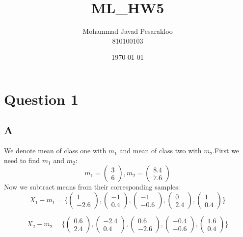 \documentclass{article}
\title{ML\_HW5}
\author{Mohammad Javad Pesarakloo\\810100103}
\date{\today}
\begin{document}
\maketitle

\section*{Question 1}
\subsection*{A}
We denote mean of class one with $m_1$ and mean of class two with $m_2$.First we need to find $m_1$ and $m_2$:
\begin{equation*}
    m_1 = \begin{pmatrix}
        3\\6
    \end{pmatrix}, m_2 = \begin{pmatrix}
        8.4\\7.6
    \end{pmatrix}
\end{equation*}
Now we subtract means from their corresponding samples:
\begin{equation*}
    X_1 - m_1 = \lbrace \begin{pmatrix}
        1\\-2.6
    \end{pmatrix},\begin{pmatrix}
        -1\\0.4
    \end{pmatrix},\begin{pmatrix}
        -1\\-0.6
    \end{pmatrix},\begin{pmatrix}
        0\\2.4
    \end{pmatrix},\begin{pmatrix}
        1\\0.4
    \end{pmatrix} \rbrace
\end{equation*}

\begin{equation*}
    X_2 - m_2 = \lbrace \begin{pmatrix}
        0.6\\2.4
    \end{pmatrix},\begin{pmatrix}
        -2.4\\0.4
    \end{pmatrix},\begin{pmatrix}
        0.6\\-2.6
    \end{pmatrix},\begin{pmatrix}
        -0.4\\-0.6
    \end{pmatrix},\begin{pmatrix}
        1.6\\0.4
    \end{pmatrix} \rbrace
\end{equation*}
\end{document}
